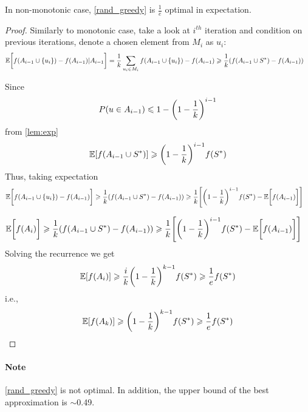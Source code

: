 \begin{theorem}
	In non-monotonic case, \vref{rand_greedy} is $\frac{1}{e}$ optimal in expectation.
	\begin{proof}
		Similarly to monotonic case, take a look at $i^{th}$ iteration and condition on previous iterations, denote a chosen element from $M_i$ as $u_i$:
		\begin{align}
		\mathbb{E} \qty\bigg[f(A_{i-1} \cup \qty{u_i}) - f(A_{i-1}) | A_{i-1} ] &= \frac{1}{k} \sum_{u_i \in M_i} f(A_{i-1} \cup \qty{u_i}) - f(A_{i-1}) \geqslant \frac{1}{k} \qty(f(A_{i-1} \cup S^*) - f(A_{i-1}) )
		\end{align}
		
		
		Since
		\begin{align}
		P(u\in A_{i-1}) \leqslant 1 - \qty(1-\frac{1}{k})^{i-1}
		\end{align}
		from \vref{lem:exp}
		\begin{align}
		\mathbb{E}\qty[f(A_{i-1} \cup S^*)] \geqslant \qty(1-\frac{1}{k})^{i-1}f(S^*)
		\end{align}
		Thus, taking expectation		
		\begin{align}
		\mathbb{E} \qty\bigg[f(A_{i-1} \cup \qty{u_i}) - f(A_{i-1}) ] &\geqslant \frac{1}{k} \qty(f(A_{i-1} \cup S^*) - f(A_{i-1}) ) \geqslant \frac{1}{k}  \qty[\qty(1-\frac{1}{k})^{i-1}f(S^*) - \mathbb{E} \qty\bigg[f(A_{i-1})] ]
		\end{align}
			
		\begin{align}
		\mathbb{E} \qty\bigg[f(A_{i} )] &\geqslant \frac{1}{k} \qty(f(A_{i-1} \cup S^*) - f(A_{i-1}) ) \geqslant \frac{1}{k}  \qty[\qty(1-\frac{1}{k})^{i-1}f(S^*) - \mathbb{E} \qty\bigg[f(A_{i-1})] ]
		\end{align}
		Solving the recurrence we get
		\begin{align}
		\mathbb{E} \qty[f(A_i)] \geqslant \frac{i}{k} \qty(1-\frac{1}{k})^{k-1} f(S^*) \geqslant \frac{1}{e}f(S^*) 
		\end{align}
		i.e.,
		\begin{align}
		\mathbb{E} \qty[f(A_k)] \geqslant  \qty(1-\frac{1}{k})^{k-1} f(S^*) \geqslant \frac{1}{e}f(S^*) 
		\end{align}
		
		
	\end{proof}
\end{theorem}

\paragraph{Note} \vref{rand_greedy} is not optimal. In addition, the upper bound of the best approximation is $\sim$0.49.
